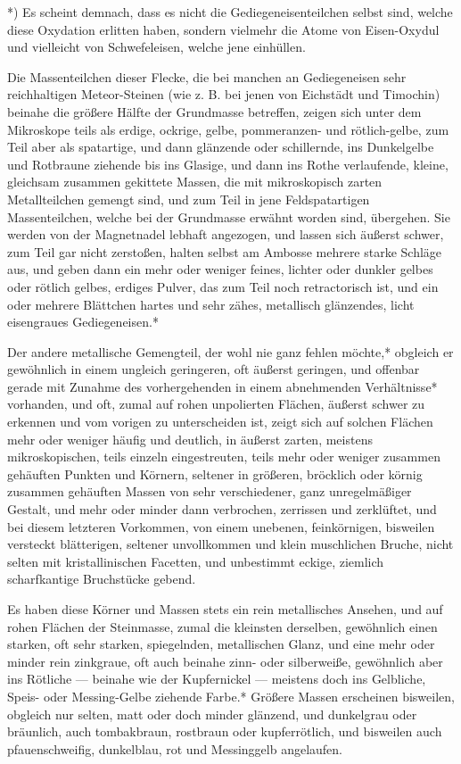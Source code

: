 \documentclass[a4paper, 11pt, oneside, german]{article}
\begin{document}
*) Es scheint demnach, dass es nicht die Gediegeneisenteilchen selbst sind, welche diese Oxydation erlitten haben, sondern vielmehr die Atome von Eisen-Oxydul und vielleicht von Schwefeleisen, welche jene einhüllen.

Die Massenteilchen dieser Flecke, die bei manchen an Gediegeneisen sehr reichhaltigen Meteor-Steinen (wie z. B. bei jenen von Eichstädt und Timochin) beinahe die größere Hälfte der Grundmasse betreffen, zeigen sich unter dem Mikroskope teils als erdige, ockrige, gelbe, pommeranzen- und rötlich-gelbe, zum Teil aber als spatartige, und dann glänzende oder schillernde, ins Dunkelgelbe und Rotbraune ziehende bis ins Glasige, und dann ins Rothe verlaufende, kleine, gleichsam zusammen gekittete Massen, die mit mikroskopisch zarten Metallteilchen gemengt sind, und zum Teil in jene Feldspatartigen Massenteilchen, welche bei der Grundmasse erwähnt worden sind, übergehen. Sie werden von der Magnetnadel lebhaft angezogen, und lassen sich äußerst schwer, zum Teil gar nicht zerstoßen, halten selbst am Ambosse mehrere starke Schläge aus, und geben dann ein mehr oder weniger feines, lichter oder dunkler gelbes oder rötlich gelbes, erdiges Pulver, das zum Teil noch retractorisch ist, und ein oder mehrere Blättchen hartes und sehr zähes, metallisch glänzendes, licht eisengraues Gediegeneisen.*

Der andere metallische Gemengteil, der wohl nie ganz fehlen möchte,* obgleich er gewöhnlich in einem ungleich geringeren, oft äußerst geringen, und offenbar gerade mit Zunahme des vorhergehenden in einem abnehmenden Verhältnisse* vorhanden, und oft, zumal auf rohen unpolierten Flächen, äußerst schwer zu erkennen und vom vorigen zu unterscheiden ist, zeigt sich auf solchen Flächen mehr oder weniger häufig und deutlich, in äußerst zarten, meistens mikroskopischen, teils einzeln eingestreuten, teils mehr oder weniger zusammen gehäuften Punkten und Körnern, seltener in größeren, bröcklich oder körnig zusammen gehäuften Massen von sehr verschiedener, ganz unregelmäßiger Gestalt, und mehr oder minder dann verbrochen, zerrissen und zerklüftet, und bei diesem letzteren Vorkommen, von einem unebenen, feinkörnigen, bisweilen versteckt blätterigen, seltener unvollkommen und klein muschlichen Bruche, nicht selten mit kristallinischen Facetten, und unbestimmt eckige, ziemlich scharfkantige Bruchstücke gebend.

Es haben diese Körner und Massen stets ein rein metallisches Ansehen, und auf rohen Flächen der Steinmasse, zumal die kleinsten derselben, gewöhnlich einen starken, oft sehr starken, spiegelnden, metallischen Glanz, und eine mehr oder minder rein zinkgraue, oft auch beinahe zinn- oder silberweiße, gewöhnlich aber ins Rötliche --- beinahe wie der Kupfernickel --- meistens doch ins Gelbliche, Speis- oder Messing-Gelbe ziehende Farbe.* Größere Massen erscheinen bisweilen, obgleich nur selten, matt oder doch minder glänzend, und dunkelgrau oder bräunlich, auch tombakbraun, rostbraun oder kupferrötlich, und bisweilen auch pfauenschweifig, dunkelblau, rot und Messinggelb angelaufen.
\end{document}
